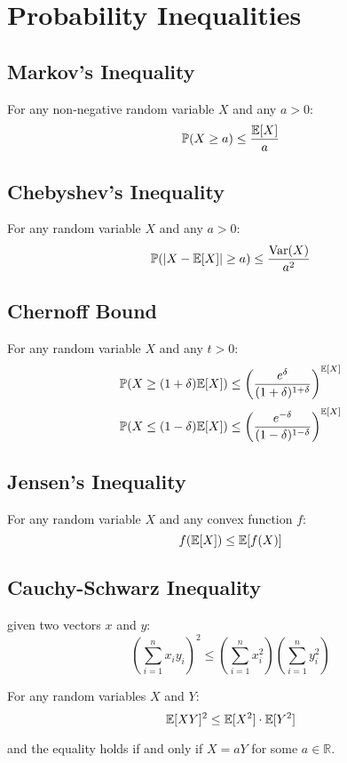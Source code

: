 \section{Probability Inequalities}
\subsection{Markov's Inequality}
For any non-negative random variable $X$ and any $a > 0$:
\[
    \mathbb{P}(X \geq a) \leq \frac{\mathbb{E}[X]}{a}
\]
\subsection{Chebyshev's Inequality}
For any random variable $X$ and any $a > 0$:
\[
    \mathbb{P}(|X - \mathbb{E}[X]| \geq a) \leq \frac{\text{Var}(X)}{a^2}
\]
\subsection{Chernoff Bound}
For any random variable $X$ and any $t > 0$:
\[
    \mathbb{P}(X \geq (1 + \delta) \mathbb{E}[X]) \leq \left( \frac{e^{\delta}}{(1 + \delta)^{1 + \delta}} \right)^{\mathbb{E}[X]}
\]
\[
    \mathbb{P}(X \leq (1 - \delta) \mathbb{E}[X]) \leq \left( \frac{e^{-\delta}}{(1 - \delta)^{1 - \delta}} \right)^{\mathbb{E}[X]}
\]
\subsection{Jensen's Inequality}
For any random variable $X$ and any convex function $f$:
\[
    f(\mathbb{E}[X]) \leq \mathbb{E}[f(X)]
\]
\subsection{Cauchy-Schwarz Inequality}
given two vectors $x$ and $y$:
\[
    \left( \sum_{i=1}^{n} x_i y_i \right)^2 \leq \left( \sum_{i=1}^{n} x_i^2 \right) \left( \sum_{i=1}^{n} y_i^2 \right)
\]

For any random variables $X$ and $Y$:
\[
    \mathbb{E}[XY]^2 \leq \mathbb{E}[X^2] \cdot \mathbb{E}[Y^2]
\]

and the equality holds if and only if $X = aY$ for some $a \in \mathbb{R}$.
